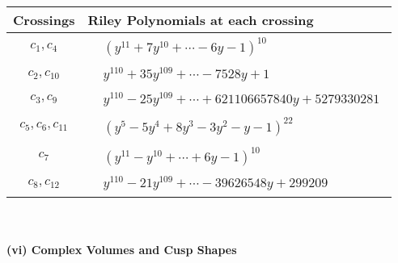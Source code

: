 \documentclass[1p]{elsarticle_modified}
\theoremstyle{definition}
\begin{document}
\begin{tabular}{m{50pt}|m{274pt}}
Crossings & \hspace{64pt}Riley Polynomials at each crossing \\
\hline $$\begin{aligned}c_{1},c_{4}\end{aligned}$$&$\begin{aligned}
&(y^{11}+7 y^{10}+\cdots-6 y-1)^{10}
\end{aligned}$\\
\hline $$\begin{aligned}c_{2},c_{10}\end{aligned}$$&$\begin{aligned}
&y^{110}+35 y^{109}+\cdots-7528 y+1
\end{aligned}$\\
\hline $$\begin{aligned}c_{3},c_{9}\end{aligned}$$&$\begin{aligned}
&y^{110}-25 y^{109}+\cdots+621106657840 y+5279330281
\end{aligned}$\\
\hline $$\begin{aligned}c_{5},c_{6},c_{11}\end{aligned}$$&$\begin{aligned}
&(y^5-5 y^4+8 y^3-3 y^2- y-1)^{22}
\end{aligned}$\\
\hline $$\begin{aligned}c_{7}\end{aligned}$$&$\begin{aligned}
&(y^{11}- y^{10}+\cdots+6 y-1)^{10}
\end{aligned}$\\
\hline $$\begin{aligned}c_{8},c_{12}\end{aligned}$$&$\begin{aligned}
&y^{110}-21 y^{109}+\cdots-39626548 y+299209
\end{aligned}$\\
\hline
\end{tabular}\\~\\
\newpage\flushleft \textbf{(vi) Complex Volumes and Cusp Shapes}
\end{document}
